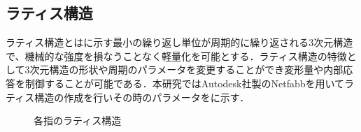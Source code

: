 \clearpage

\subsection{ラティス構造}
ラティス構造とはに示す最小の繰り返し単位が周期的に繰り返される3次元構造で、機械的な強度を損なうことなく軽量化を可能とする\cite{latice}．ラティス構造の特徴として3次元構造の形状や周期のパラメータを変更することができ変形量や内部応答を制御することが可能である．本研究ではAutodesk社製のNetfabbを用いてラティス構造の作成を行いその時のパラメータをに示す．


\begin{figure}[h]
\centering
{}
\hspace{5mm}
\caption{各指のラティス構造}
\label{fig::latice}
\end{figure}

